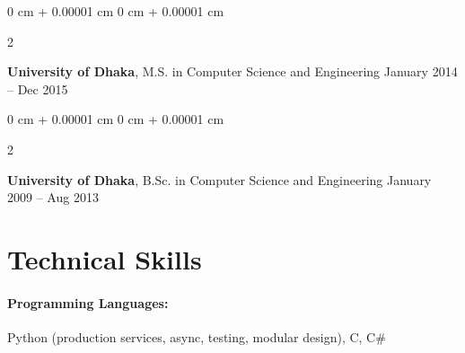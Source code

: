 \documentclass[10pt, letterpaper]{article}
\newenvironment{highlights}{
    \begin{itemize}[
        topsep=0.10 cm,
        parsep=0.10 cm,
        partopsep=0pt,
        itemsep=0pt,
        leftmargin=0 cm + 10pt
    ]
}{
    \end{itemize}
} %
\newenvironment{onecolentry}{
    \begin{adjustwidth}{
        0 cm + 0.00001 cm
    }{
        0 cm + 0.00001 cm
    }
}{
    \end{adjustwidth}
} %
\newenvironment{twocolentry}[2][]{
    \onecolentry
    \def\secondColumn{#2}
    \setcolumnwidth{\fill, 4.5 cm}
    \begin{paracol}{2}
}{
    \switchcolumn \raggedleft \secondColumn
    \end{paracol}
    \endonecolentry
} %
\begin{document}
        \begin{twocolentry}{
            January 2014 – Dec 2015
        }
            \textbf{University of Dhaka}, M.S. in Computer Science and Engineering\end{twocolentry}


        \begin{twocolentry}{
            January 2009 – Aug 2013
        }
            \textbf{University of Dhaka}, B.Sc. in Computer Science and Engineering\end{twocolentry}
    
        




\vspace{-1mm}
\section{Technical Skills}

        \paragraph{Programming Languages:} Python (production services, async, testing, modular design), C, C\#
        \vspace{-4mm}
\end{document}
